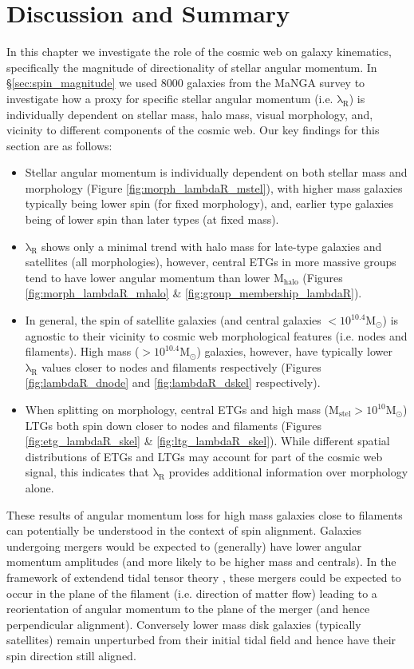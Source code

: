 \section{Discussion and Summary} \label{sec:cw_spin_conclusion}
In this chapter we investigate the role of the cosmic web on galaxy kinematics, specifically the magnitude of directionality of stellar angular momentum. In \S\ref{sec:spin_magnitude} we used 8000 galaxies from the MaNGA survey to investigate how a proxy for specific stellar angular momentum (i.e. $\mathrm{\lambda_R}$) is individually dependent on stellar mass, halo mass, visual morphology, and, vicinity to different components of the cosmic web. Our key findings for this section are as follows:
\begin{itemize}
    \item Stellar angular momentum is individually dependent on both stellar mass and morphology (Figure \ref{fig:morph_lambdaR_mstel}), with higher mass galaxies typically being lower spin (for fixed morphology), and, earlier type galaxies being of lower spin than later types (at fixed mass).
    \item $\mathrm{\lambda_R}$ shows only a minimal trend with halo mass for late-type galaxies and satellites (all morphologies), however, central ETGs in more massive groups tend to have lower angular momentum than lower $\mathrm{M_{halo}}$ (Figures \ref{fig:morph_lambdaR_mhalo} \& \ref{fig:group_membership_lambdaR}). 
    \item In general, the spin of satellite galaxies (and central galaxies $\mathrm{< 10^{10.4}M_{\odot}}$) is agnostic to their vicinity to cosmic web morphological features (i.e. nodes and filaments). High mass ($\mathrm{> 10^{10.4}M_{\odot}}$) galaxies, however, have typically lower $\mathrm{\lambda_R}$ values closer to nodes and filaments respectively (Figures \ref{fig:lambdaR_dnode} and \ref{fig:lambdaR_dskel} respectively). 
    \item When splitting on morphology, central ETGs and high mass ($\mathrm{M_{stel} > 10^{10}M_{\odot}}$) LTGs both spin down closer to nodes and filaments (Figures \ref{fig:etg_lambdaR_skel} \& \ref{fig:ltg_lambdaR_skel}). While different spatial distributions of ETGs and LTGs may account for part of the cosmic web signal, this indicates that $\mathrm{\lambda_R}$ provides additional information over morphology alone.
\end{itemize}
These results of angular momentum loss for high mass galaxies close to filaments can potentially be understood in the context of spin alignment. Galaxies undergoing mergers would be expected to (generally) have lower angular momentum amplitudes (and more likely to be higher mass and centrals). In the framework of extendend tidal tensor theory \citep{laigle2015}, these mergers could be expected to occur in the plane of the filament (i.e. direction of matter flow) leading to a reorientation of angular momentum to the plane of the merger (and hence perpendicular alignment). Conversely lower mass disk galaxies (typically satellites) remain unperturbed from their initial tidal field and hence have their spin direction still aligned. 

